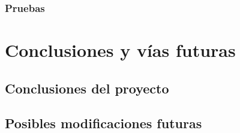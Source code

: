 \documentclass[10pt, a4paper]{aqademic}
\begin{document}
\subsection{Pruebas}


\chapter{Conclusiones y vías futuras}

\section{Conclusiones del proyecto}

\section{Posibles modificaciones futuras}

\newpage



\end{document}
